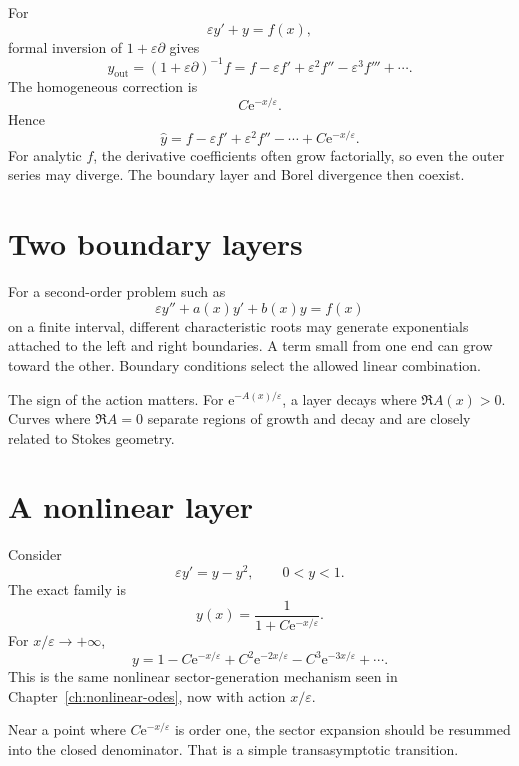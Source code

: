 \documentclass[11pt,openany]{book}
\theoremstyle{definition}
\theoremstyle{plain}
\theoremstyle{remark}
\newcommand{\eps}{\varepsilon}
\newcommand{\e}{\mathrm{e}}
\newcommand{\trans}[1]{\widehat{#1}}
\begin{document}
For
\begin{equation}\label{eq:boundary-general}
 \eps y'+y=f(x),
\end{equation}
formal inversion of $1+\eps\partial$ gives
\begin{equation}\label{eq:outer-neumann}
 y_{\mathrm{out}}
 =(1+\eps\partial)^{-1}f
 =f-\eps f'+\eps^2f''-\eps^3f'''+\cdots.
\end{equation}
The homogeneous correction is
\[
 C\e^{-x/\eps}.
\]
Hence
\begin{equation}\label{eq:boundary-general-transseries}
 \trans y=f-\eps f'+\eps^2f''-\cdots+C\e^{-x/\eps}.
\end{equation}
For analytic $f$, the derivative coefficients often grow factorially, so even the outer series may diverge. The boundary layer and Borel divergence then coexist.

\section{Two boundary layers}

For a second-order problem such as
\[
 \eps y''+a(x)y'+b(x)y=f(x)
\]
on a finite interval, different characteristic roots may generate exponentials attached to the left and right boundaries. A term small from one end can grow toward the other. Boundary conditions select the allowed linear combination.

The sign of the action matters. For $\e^{-A(x)/\eps}$, a layer decays where $\Re A(x)>0$. Curves where $\Re A=0$ separate regions of growth and decay and are closely related to Stokes geometry.

\section{A nonlinear layer}

Consider
\begin{equation}\label{eq:nonlinear-layer}
 \eps y'=y-y^2,
 \qquad 0<y<1.
\end{equation}
The exact family is
\[
 y(x)=\frac{1}{1+C\e^{-x/\eps}}.
\]
For $x/\eps\to+\infty$,
\begin{equation}\label{eq:nonlinear-layer-transseries}
 y=1-C\e^{-x/\eps}+C^2\e^{-2x/\eps}
 -C^3\e^{-3x/\eps}+\cdots.
\end{equation}
This is the same nonlinear sector-generation mechanism seen in Chapter~\ref{ch:nonlinear-odes}, now with action $x/\eps$.

Near a point where $C\e^{-x/\eps}$ is order one, the sector expansion should be resummed into the closed denominator. That is a simple transasymptotic transition.
\end{document}

